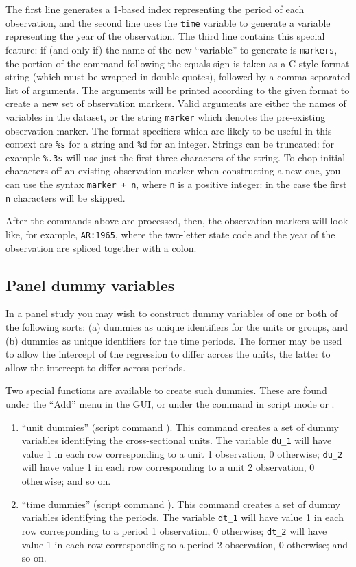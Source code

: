 The first line generates a 1-based index representing the period of
each observation, and the second line uses the \texttt{time} variable
to generate a variable representing the year of the observation.  The
third line contains this special feature: if (and only if) the name of
the new ``variable'' to generate is \texttt{markers}, the portion of
the command following the equals sign is taken as a C-style format
string (which must be wrapped in double quotes), followed by a
comma-separated list of arguments.  The arguments will be printed
according to the given format to create a new set of observation
markers.  Valid arguments are either the names of variables in the
dataset, or the string \texttt{marker} which denotes the pre-existing
observation marker.  The format specifiers which are likely to be
useful in this context are \texttt{\%s} for a string and \texttt{\%d}
for an integer.  Strings can be truncated: for example \texttt{\%.3s}
will use just the first three characters of the string.  To chop
initial characters off an existing observation marker when
constructing a new one, you can use the syntax \texttt{marker + n},
where \texttt{n} is a positive integer: in the case the first
\texttt{n} characters will be skipped.

After the commands above are processed, then, the observation markers
will look like, for example, \texttt{AR:1965}, where the two-letter
state code and the year of the observation are spliced together with a
colon.

\subsection{Panel dummy variables}
\label{panel-dummies}

In a panel study you may wish to construct dummy variables of one or
both of the following sorts: (a) dummies as unique identifiers for the
units or groups, and (b) dummies as unique identifiers for the time
periods.  The former may be used to allow the intercept of the
regression to differ across the units, the latter to allow the
intercept to differ across periods.

Two special functions are available to create such dummies.  These are
found under the ``Add'' menu in the GUI, or under the 
command in script mode or .

\begin{enumerate}
\item ``unit dummies'' (script command ).  This
  command creates a set of dummy variables identifying the
  cross-sectional units.  The variable \verb+du_1+ will have value 1
  in each row corresponding to a unit 1 observation, 0 otherwise;
  \verb+du_2+ will have value 1 in each row corresponding to a unit 2
  observation, 0 otherwise; and so on.
\item ``time dummies'' (script command ).  This
  command creates a set of dummy variables identifying the periods.
  The variable \verb+dt_1+ will have value 1 in each row
  corresponding to a period 1 observation, 0 otherwise; \verb+dt_2+
  will have value 1 in each row corresponding to a period 2
  observation, 0 otherwise; and so on.
\end{enumerate}


